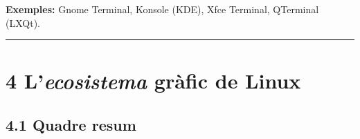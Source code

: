 \documentclass[
  a4paper,
]{article}
\begin{document}
\textbf{Exemples:} Gnome Terminal, Konsole (KDE), Xfce Terminal,
QTerminal (LXQt).

\begin{center}\rule{0.5\linewidth}{0.5pt}\end{center}

\section{\texorpdfstring{4 L'\emph{ecosistema} gràfic de
Linux}{4 L'ecosistema gràfic de Linux}}\label{lecosistema-gruxe0fic-de-linux}

\subsection{4.1 Quadre resum}\label{quadre-resum}
\end{document}
